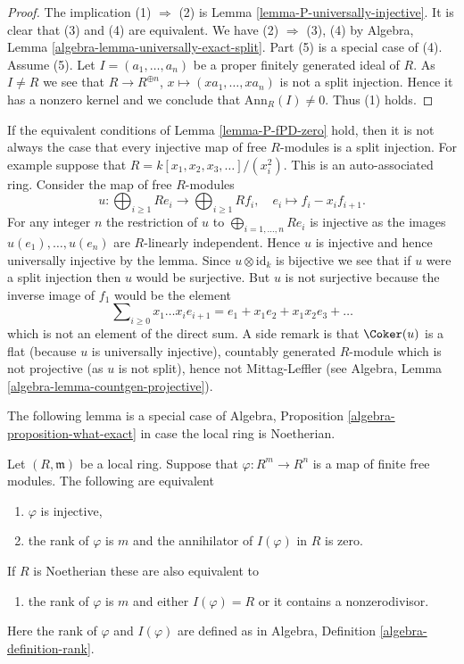 \begin{proof}
The implication (1) $\Rightarrow$ (2) is
Lemma \ref{lemma-P-universally-injective}.
It is clear that (3) and (4) are equivalent.
We have (2) $\Rightarrow$ (3), (4) by
Algebra, Lemma \ref{algebra-lemma-universally-exact-split}.
Part (5) is a special case of (4).
Assume (5). Let $I = (a_1, \ldots, a_n)$ be a proper finitely generated
ideal of $R$. As $I \not = R$ we see that
$R \to R^{\oplus n}$, $x \mapsto (xa_1, \ldots, xa_n)$
is not a split injection. Hence it has a nonzero kernel and we conclude
that $\text{Ann}_R(I) \not = 0$. Thus (1) holds.
\end{proof}

\begin{example}
\label{example-auto-ass-weird-flat}
If the equivalent conditions of
Lemma \ref{lemma-P-fPD-zero}
hold, then it is not always the case that every injective map of
free $R$-modules is a split injection. For example suppose that
$R = k[x_1, x_2, x_3, \ldots]/(x_i^2)$. This is an auto-associated ring.
Consider the map of free $R$-modules
$$
u :
\bigoplus\nolimits_{i \geq 1} Re_i
\longrightarrow
\bigoplus\nolimits_{i \geq 1} Rf_i, \quad
e_i \longmapsto f_i - x_if_{i + 1}.
$$
For any integer $n$ the restriction of $u$ to
$\bigoplus_{i = 1, \ldots, n} Re_i$ is injective as the images
$u(e_1), \ldots, u(e_n)$ are $R$-linearly independent. Hence
$u$ is injective and hence universally injective by the lemma.
Since $u \otimes \text{id}_k$ is bijective we see that if
$u$ were a split injection then $u$ would be surjective. But $u$ is not
surjective because the inverse image of $f_1$ would be the element
$$
\sum\nolimits_{i \geq 0} x_1 \ldots x_ie_{i + 1} =
e_1 + x_1e_2 + x_1x_2e_3 + \ldots
$$
which is not an element of the direct sum. A side remark is that
$\Coker(u)$ is a flat (because $u$ is universally injective),
countably generated $R$-module which is not projective (as $u$ is not
split), hence not Mittag-Leffler (see
Algebra, Lemma \ref{algebra-lemma-countgen-projective}).
\end{example}

\noindent
The following lemma is a special case of
Algebra, Proposition \ref{algebra-proposition-what-exact}
in case the local ring is Noetherian.

\begin{lemma}
\label{lemma-exact-length-1}
Let $(R, \mathfrak m)$ be a local ring.
Suppose that $\varphi : R^m \to R^n$ is a map
of finite free modules. The following are equivalent
\begin{enumerate}
\item $\varphi$ is injective,
\item the rank of $\varphi$ is $m$ and the annihilator of
$I(\varphi)$ in $R$ is zero.
\end{enumerate}
If $R$ is Noetherian these are also equivalent to
\begin{enumerate}
\item[(3)] the rank of $\varphi$ is $m$ and
either $I(\varphi) = R$ or it contains a nonzerodivisor.
\end{enumerate}
Here the rank of $\varphi$ and $I(\varphi)$ are defined
as in Algebra, Definition \ref{algebra-definition-rank}.
\end{lemma}

